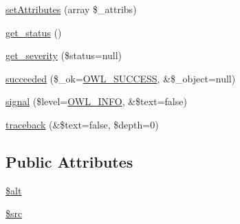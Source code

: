 \begin{DoxyCompactItemize}
\item 
\hyperlink{classBaseElement_a7d8ddd64ceb3401a7cb84548656b3709}{setAttributes} (array \$\_\-attribs)
\item 
\hyperlink{class__OWL_a99ec771fa2c5c279f80152cc09e489a8}{get\_\-status} ()
\item 
\hyperlink{class__OWL_adf9509ef96858be7bdd9414c5ef129aa}{get\_\-severity} (\$status=null)
\item 
\hyperlink{class__OWL_a53ab4d3bbb2c6a56966c339ca4b4c805}{succeeded} (\$\_\-ok=\hyperlink{owl_8severitycodes_8php_a96223f06ba27bf5cbefa6e9d702897c2}{OWL\_\-SUCCESS}, \&\$\_\-object=null)
\item 
\hyperlink{class__OWL_a51ba4a16409acf2a2f61f286939091a5}{signal} (\$level=\hyperlink{owl_8severitycodes_8php_a139328861128689f2f4def6a399d9057}{OWL\_\-INFO}, \&\$text=false)
\item 
\hyperlink{class__OWL_aa29547995d6741b7d2b90c1d4ea99a13}{traceback} (\&\$text=false, \$depth=0)
\end{DoxyCompactItemize}
\subsection*{Public Attributes}
\begin{DoxyCompactItemize}
\item 
\hyperlink{classFormFieldButtonPlugin_ad508b2eca248b109cb6409abdf00ffb5}{\$alt}
\item 
\hyperlink{classFormFieldButtonPlugin_a33519a89924287c0b7628a006438cac2}{\$src}
\end{DoxyCompactItemize}
